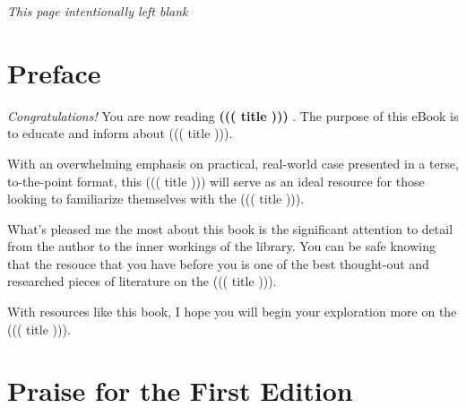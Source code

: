 \documentclass{article}
\begin{document}


\clearpage

\noindent
\begin{center}
{\normalsize \emph{This page intentionally left blank}}
\end{center}

\clearpage

\section*{Preface}
{\normalsize
\begin{flushleft}
\emph{Congratulations!} You are now reading \textbf{ ((( title ))) }. The
purpose of this eBook is to educate and inform about ((( title ))).
\end{flushleft}

\begin{flushleft}
With an overwhelming emphasis on practical, real-world case presented
in a terse, to-the-point format, this ((( title ))) will serve as an
ideal resource for those looking to familiarize themselves with the 
((( title ))).
\end{flushleft}

\begin{flushleft}
What's pleased me the most about this book is the significant
attention to detail from the author to the inner workings of the
library. You can be safe knowing that the resouce that you have before
you is one of the best thought-out and researched pieces of literature
on the ((( title ))).
\end{flushleft}

\begin{flushleft}
With resources like this book, I hope you will begin your exploration
more on the ((( title ))).
\end{flushleft}
}

\clearpage

\section*{Praise for the First Edition}
\end{document}
